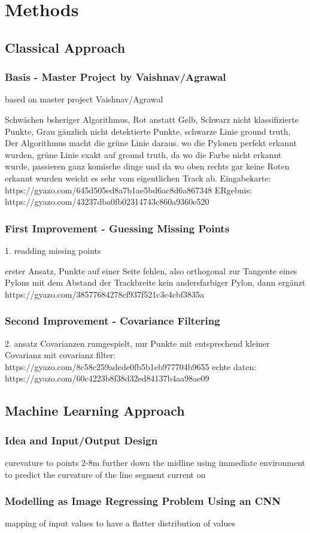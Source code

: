 \graphicspath{{Chapter/Figs/methods/}}
\chapter{Methods}

\section{Classical Approach}

\subsection{Basis - Master Project by Vaishnav/Agrawal}
based on master project Vaishnav/Agrawal

Schwächen bsheriger Algorithmus, Rot anstatt Gelb, Schwarz nicht klassifizierte Punkte, Grau gänzlich nicht detektierte Punkte,
schwarze Linie ground truth, Der Algorithmus macht die grüne Linie daraus.
wo die Pylonen perfekt erkannt wurden, grüne Linie exakt auf ground truth,
da wo die Farbe nicht erkannt wurde, passieren ganz komische dinge
und da wo oben rechts gar keine Roten erkannt wurden weicht es sehr vom eigentlichen Track ab.
Eingabekarte: https://gyazo.com/645d505ed8a7b1ae5bd6ac8d6a867348
ERgebnis: https://gyazo.com/43237dba0fb02314743c860a9360e520

\subsection{First Improvement - Guessing Missing Points}
1. readding missing points

erster Ansatz, Punkte auf einer Seite fehlen,
also orthogonal zur Tangente eines Pylons mit dem Abstand der Trackbreite kein andersfarbiger Pylon, dann ergänzt
https://gyazo.com/38577684278cf937f521c3c4cbf3835a

\subsection{Second Improvement - Covariance Filtering}

2. ansatz Covarianzen rumgespielt, nur Punkte mit entsprechend kleiner Covarianz
mit covarianz filter: https://gyazo.com/8c58c259adede0fb5b1eb977704b9655
echte daten:
https://gyazo.com/60c4223b8f38d32ed84137b4aa98ae09

\section{Machine Learning Approach}
\subsection{Idea and Input/Output Design}
curevature to points 2-8m further down the midline
using immediate environment to predict the curvature of the line segment current on
\subsection{Modelling as Image Regressing Problem Using an CNN}
mapping of input values to have a flatter distribution of values
